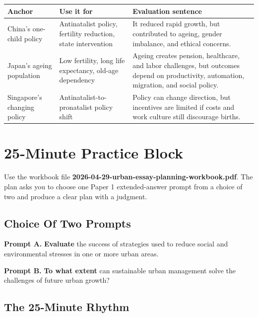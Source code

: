\documentclass[11pt,a4paper]{article}
\newcommand{\term}[1]{\textcolor{HeadingBlue}{\textbf{#1}}}
\newcommand{\exam}[1]{\textcolor{AccentTeal}{\textbf{#1}}}
\newcommand{\boxnote}[3]{%
\noindent\colorbox{#1}{%
  \begin{minipage}{0.965\textwidth}
  \sffamily
  \textbf{\textcolor{HeadingBlue}{#2}} #3
  \end{minipage}
}}
\begin{document}
\begin{tabularx}{\textwidth}{L{0.2\textwidth}Y Y}
\toprule
\textbf{Anchor} & \textbf{Use it for} & \textbf{Evaluation sentence} \\
\midrule
China's one-child policy & Antinatalist policy, fertility reduction, state
intervention & It reduced rapid growth, but contributed to ageing, gender
imbalance, and ethical concerns. \\
Japan's ageing population & Low fertility, long life expectancy, old-age
dependency & Ageing creates pension, healthcare, and labor challenges, but
outcomes depend on productivity, automation, migration, and social policy. \\
Singapore's changing policy & Antinatalist-to-pronatalist policy shift & Policy
can change direction, but incentives are limited if costs and work culture still
discourage births. \\
\bottomrule
\end{tabularx}

\section{25-Minute Practice Block}

Use the workbook file
\term{2026-04-29-urban-essay-planning-workbook.pdf}. The plan asks you to
choose one Paper 1 extended-answer prompt from a choice of two and produce a
clear plan with a judgment.

\subsection{Choice Of Two Prompts}

\boxnote{SoftTint}{Prompt A.}{\exam{Evaluate} the success of strategies used to
reduce social and environmental stresses in one or more urban areas.}

\vspace{0.5em}

\boxnote{SoftBlue}{Prompt B.}{\exam{To what extent} can sustainable urban
management solve the challenges of future urban growth?}

\subsection{The 25-Minute Rhythm}
\end{document}
